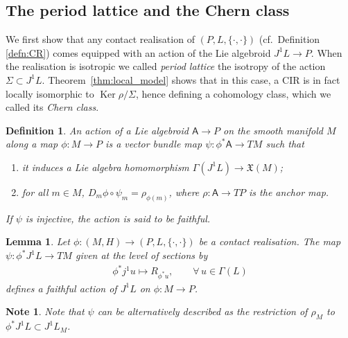 \documentclass[pdftex]{sigma}
\numberwithin{equation}{section}
\newtheorem{Lemma}[Theorem]{Lemma}
\newtheorem{Definition}[Theorem]{Definition}
\newtheorem{Note}[Theorem]{Note}
\newcommand{\X}{\ensuremath{\mathfrak{X}}}
\newcommand{\Ker}{\operatorname{Ker}} %
\newcommand{\JM}{(P,L,\{\cdot,\cdot\})} %
\newcommand{\CM}{(M,H)} %
\begin{document}
\subsection{The period lattice and the Chern class}

 We f\/irst show that any contact realisation of $\JM$ (cf.\ Def\/inition \ref{defn:CR}) comes equipped with an action of the Lie algebroid $J^1L \to P$. When the realisation is isotropic we called {\it period lattice} the isotropy of the action $\Sigma\subset J^1L$. Theorem~\ref{thm:local_model} shows that in this case, a CIR is in fact locally isomorphic to $\Ker\rho/\Sigma$, hence def\/ining a cohomology class, which we called its {\it Chern class}.

\begin{Definition}\label{defn:action_alg} An {\it action} of a Lie algebroid $\mathsf{A} \to P$ on the smooth manifold $M$ along a map $\phi \colon M \to P$ is a vector bundle map $\psi\colon \phi^*\mathsf{A} \to TM$ such that
 \begin{enumerate}[label=(A\arabic*), ref=(A\arabic*)]\itemsep=0pt
 \item \label{item:3} it induces a Lie algebra homomorphism $\Gamma(J^1L)\to \X(M)$;
 \item \label{item:4} for all $m \in M$, $D_m\phi\circ \psi_m=\rho_{\phi(m)}$, where $\rho \colon \mathsf{A} \to TP$ is the anchor map.
 \end{enumerate}
 If $\psi$ is injective, the action is said to be {\em faithful}.
\end{Definition}

\begin{Lemma}\label{lemma:action}
 Let $\phi\colon \CM\to\JM$ be a contact realisation. The map $\psi\colon \phi^*J^1L\to T M$ given at the level of sections by
 \begin{gather*}
 \phi^*j^1 u\mapsto R_{\phi^*u},\qquad \forall\, u\in \Gamma(L)
 \end{gather*}
defines a faithful action of $J^1L$ on $\phi \colon M \to P$.
\end{Lemma}

\begin{Note}\label{rk:action}
Note that $\psi$ can be alternatively described as the restriction of $\rho_M$ to $\phi^*J^1L \subset J^1L_M$.
\end{Note}
\end{document}
